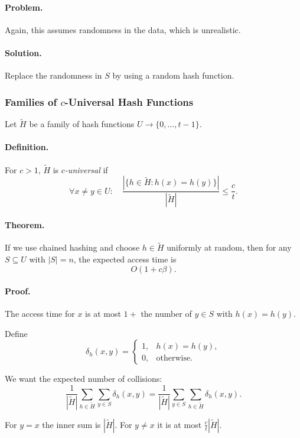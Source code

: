 \documentclass{article}
\begin{document}
\paragraph{Problem.}  
Again, this assumes randomness in the data, which is unrealistic.

\paragraph{Solution.}  
Replace the randomness in $S$ by using a random hash function.

\subsubsection{Families of $c$-Universal Hash Functions} \label{subsub:cuni}

Let $\tilde{H}$ be a family of hash functions $U \to \{0,\dots,t-1\}$.

\paragraph{Definition.}  
For $c > 1$, $\tilde{H}$ is \emph{$c$-universal} if
\[
\forall x\neq y\in U:\quad
\frac{|\{h\in\tilde{H} : h(x)=h(y)\}|}{|\tilde{H}|}
  \le \frac{c}{t}.
\]


\paragraph{Theorem.}  
If we use chained hashing and choose $h\in\tilde{H}$ uniformly at random, then for any $S\subseteq U$ with $|S|=n$, the expected access time is
\[
O(1+c\beta).
\]

\paragraph{Proof.}  
The access time for $x$ is at most $1+$ the number of $y\in S$ with $h(x)=h(y)$.

Define
\[
\delta_h(x,y) = 
\begin{cases}
1, & h(x)=h(y),\\
0, & \text{otherwise}.
\end{cases}
\]

We want the expected number of collisions:
\[
\frac{1}{|\tilde{H}|}
  \sum_{h\in\tilde{H}}\sum_{y\in S}\delta_h(x,y)
= \frac{1}{|\tilde{H}|}
  \sum_{y\in S}\sum_{h\in\tilde{H}}\delta_h(x,y).
\]

For $y=x$ the inner sum is $|\tilde{H}|$.  
For $y\neq x$ it is at most $\frac{c}{t}|\tilde{H}|$.
\end{document}
